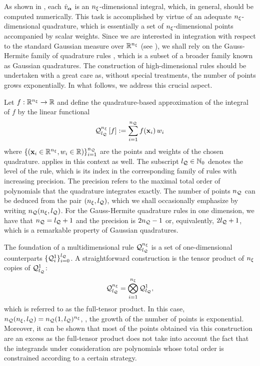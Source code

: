 As shown in , each $\hat{v}_{\bm{\alpha}}$ is an ${n_\xi}$-dimensional integral, which, in general, should be computed numerically.
This task is accomplished by virtue of an adequate ${n_\xi}$-dimensional quadrature, which is essentially a set of ${n_\xi}$-dimensional points accompanied by scalar weights.
Since we are interested in integration with respect to the standard Gaussian measure over $\mathbb{R}^{n_\xi}$ (see ), we shall rely on the Gauss-Hermite family of quadrature rules \cite{maitre2010}, which is a subset of a broader family known as Gaussian quadratures.
The construction of high-dimensional rules should be undertaken with a great care as, without special treatments, the number of points grows exponentially.
In what follows, we address this crucial aspect.

Let $f: \mathbb{R}^{n_\xi} \to \mathbb{R}$ and define the quadrature-based approximation of the integral of $f$ by the linear functional
\[
  \quadrature{\nvars}{\nqlevel}{f} := \sum_{i = 1}^\nqorder f(\point_i) \, \weight_i
\]
where $\{ (\mathbf{x}_i \in \mathbb{R}^{n_\xi}, w_i \in \mathbb{R}) \}_{i = 1}^{n_\mathcal{Q}}$ are the points and weights of the chosen quadrature.
 applies in this context as well.
The subscript ${l_\mathcal{Q}} \in \mathbb{N}_{0}$ denotes the level of the rule, which is its index in the corresponding family of rules with increasing precision.
The precision refers to the maximal total order of polynomials that the quadrature integrates exactly.
The number of points ${n_\mathcal{Q}}$ can be deduced from the pair $({n_\xi}, {l_\mathcal{Q}})$, which we shall occasionally emphasize by writing ${n_\mathcal{Q}}({n_\xi}, {l_\mathcal{Q}})$.
For the Gauss-Hermite quadrature rules in one dimension, we have that ${n_\mathcal{Q}} = {l_\mathcal{Q}} + 1$ and the precision is $2 {n_\mathcal{Q}} - 1$ or, equivalently, $2 {l_\mathcal{Q}} + 1$, which is a remarkable property of Gaussian quadratures.

The foundation of a multidimensional rule $\quadrature$ is a set of one-dimensional counterparts $\{ \quadrature{1}{i} \}_{i = 0}^\nqlevel$.
A straightforward construction is the tensor product of ${n_\xi}$ copies of $\quadrature{1}{\nqlevel}$:
\begin{equation} \xelab{full-tensor-product-grid}
  \quadrature = \bigotimes_{i = 1}^\nvars \quadrature{1}{\nqlevel},
\end{equation}
which is referred to as the full-tensor product.
In this case, ${n_\mathcal{Q}}({n_\xi}, {l_\mathcal{Q}}) = {n_\mathcal{Q}}(1, {l_\mathcal{Q}})^{n_\xi}$, \ie, the growth of the number of points is exponential.
Moreover, it can be shown that most of the points obtained via this construction are an excess as the full-tensor product does not take into account the fact that the integrands under consideration are polynomials whose total order is constrained according to a certain strategy.

